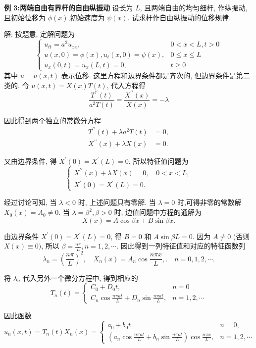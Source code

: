 \textbf{例 3:两端自由有界杆的自由纵振动} \quad 设长为 $ L $, 且两端自由的均匀细杆, 作纵振动, 且初始位移为 $ \phi(x) $,初始速度为 $ \psi(x) $. 试求杆作自由纵振动的位移规律.

解: 按题意, 定解问题为
$$
\left\{\begin{array}{ll}
u_{t t}=a^{2} u_{x x}, & 0<x<L, t>0 \\
u(x, 0)=\phi(x), u_{t}(x, 0)=\psi(x), & 0 \leqslant x \leqslant L \\
u_{x}(0, t)=u_{x}(L, t)=0, & t \geqslant 0
\end{array}\right.
$$
其中 $ u=u(x, t) $ 表示位移. 这里方程和边界条件都是齐次的, 但边界条件是第二类的. 令 $ u(x, t)=X(x) T(t) $, 代入方程得
$$
\frac{T^{\prime \prime}(t)}{a^{2} T(t)}=\frac{X^{\prime \prime}(x)}{X(x)}=-\lambda
$$

因此得到两个独立的常微分方程
$$
\begin{aligned}
T^{\prime \prime}(t)+\lambda a^{2} T(t) & =0, \\
X^{\prime \prime}(x)+\lambda X(x) & =0 .
\end{aligned}
$$

又由边界条件, 得 $ X^{\prime}(0)=X^{\prime}(L)=0 $. 所以特征值问题为
$$
\left\{\begin{array}{l}
X^{\prime \prime}(x)+\lambda X(x)=0, \quad 0<x<L, \\
X^{\prime}(0)=X^{\prime}(L)=0 .
\end{array}\right.
$$

经过讨论可知, 当 $ \lambda<0 $ 时, 上述问题只有零解. 当 $ \lambda=0 $ 时,可得非零的常数解 $ X_{0}(x)=A_{0} \neq 0 $. 当 $ \lambda=\beta^{2}, \beta>0 $ 时, 边值问题中方程的通解为
$$
X(x)=A \cos \beta x+B \sin \beta x .
$$

由边界条件 $ X^{\prime}(0)=X^{\prime}(L)=0 $, 得 $ B=0 $ 和 $ A \sin \beta L=0 $. 因为 $ A \neq 0 $ (否则 $ X(x) \equiv 0) $, 所以 $ \beta=\frac{n \pi}{L}, n=1,2, \cdots $. 因此得到一列特征值和对应的特征函数列
$$
\lambda_{n}=\left(\frac{n \pi}{L}\right)^{2}, \quad X_{n}(x)=A_{n} \cos \frac{n \pi x}{L}, . \quad n=0,1,2, \cdots .
$$

将 $ \lambda_{n} $ 代入另外一个微分方程中, 得到相应的
$$
T_{n}(t)=\left\{\begin{array}{ll}
C_{0}+D_{0} t, & n=0 \\
C_{n} \cos \frac{n \pi a t}{L}+D_{n} \sin \frac{n \pi a t}{L}, & n=1,2, \cdots
\end{array}\right.
$$

因此函数
$$
u_{n}(x, t)=T_{n}(t) X_{n}(x)=\left\{\begin{array}{ll}
a_{0}+b_{0} t & n=0, \\
\left(a_{n} \cos \frac{n \pi a t}{L}+b_{n} \sin \frac{n \pi a t}{L}\right) \cos \frac{n \pi x}{L}, & n=1,2, \cdots
\end{array}\right.
$$

